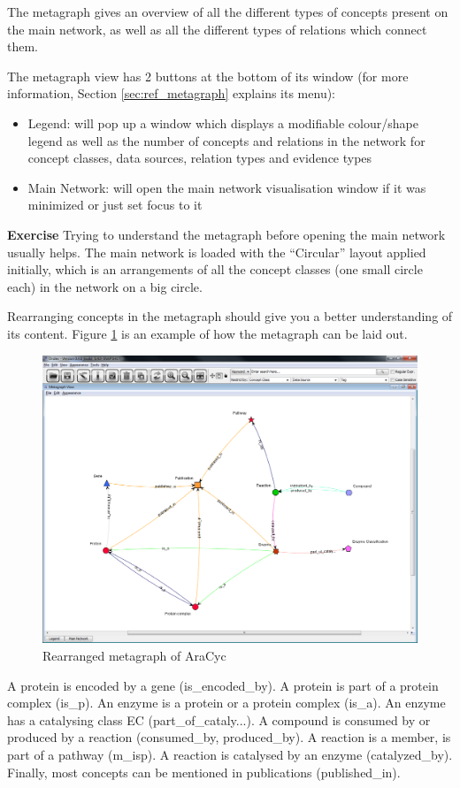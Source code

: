 The metagraph gives an overview of all the different types of concepts present on the main network, as well as all the different types of relations which connect them.

The metagraph view has 2 buttons at the bottom of its window (for more information, Section \ref{sec:ref_metagraph} explains its menu):
\begin{itemize}
\item Legend: will pop up a window which displays a modifiable colour/shape legend as well as 
the number of concepts and relations in the network for concept classes, data sources, relation types and evidence types
\item Main Network: will open the main network visualisation window if it was minimized or just set focus to it
\end{itemize}


\exerciserule
\textbf{Exercise}
Trying to understand the metagraph before opening the main network usually helps. 
The main network is loaded with the ``Circular'' layout applied initially, which is an arrangements of all the concept classes (one small circle each) in the network on a big circle.

Rearranging concepts in the metagraph should give you a better understanding of its content. 
Figure \ref{fig:metagraph_rearranged} is an example of how the metagraph can be laid out.
\begin{figure}[H]
\centering
\includegraphics[scale=0.3]{images/Jun12/aracyc_rearranged_metagraph.png} 
\caption{Rearranged metagraph of AraCyc}
\label{fig:metagraph_rearranged}
\end{figure}
A protein is encoded by a gene (is\_encoded\_by).
A protein is part of a protein complex (is\_p).
An enzyme is a protein or a protein complex (is\_a).
An enzyme has a catalysing class EC (part\_of\_cataly...).
A compound is consumed by or produced by a reaction (consumed\_by, produced\_by).
A reaction is a member, is part of a pathway (m\_isp).
A reaction is catalysed by an enzyme (catalyzed\_by).
Finally, most concepts can be mentioned in publications (published\_in).

